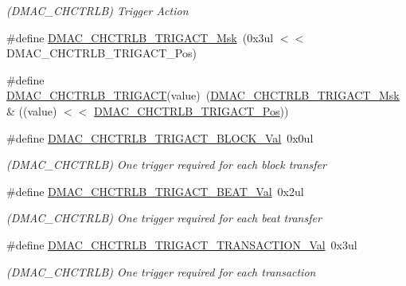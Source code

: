 \begin{DoxyCompactItemize}
\begin{DoxyCompactList}\small\item\em (D\+M\+A\+C\+\_\+\+C\+H\+C\+T\+R\+LB) Trigger Action \end{DoxyCompactList}\item 
\#define \mbox{\hyperlink{group___s_a_m_d21___d_m_a_c_ga539afbe9e0308fd3b76b4ae7ff9db0ff}{D\+M\+A\+C\+\_\+\+C\+H\+C\+T\+R\+L\+B\+\_\+\+T\+R\+I\+G\+A\+C\+T\+\_\+\+Msk}}~(0x3ul $<$$<$ D\+M\+A\+C\+\_\+\+C\+H\+C\+T\+R\+L\+B\+\_\+\+T\+R\+I\+G\+A\+C\+T\+\_\+\+Pos)
\item 
\#define \mbox{\hyperlink{group___s_a_m_d21___d_m_a_c_gabd1ec3b5b2a9f0a0c59797a186296acd}{D\+M\+A\+C\+\_\+\+C\+H\+C\+T\+R\+L\+B\+\_\+\+T\+R\+I\+G\+A\+CT}}(value)~(\mbox{\hyperlink{group___s_a_m_d21___d_m_a_c_ga539afbe9e0308fd3b76b4ae7ff9db0ff}{D\+M\+A\+C\+\_\+\+C\+H\+C\+T\+R\+L\+B\+\_\+\+T\+R\+I\+G\+A\+C\+T\+\_\+\+Msk}} \& ((value) $<$$<$ \mbox{\hyperlink{group___s_a_m_d21___d_m_a_c_gaada77814aa3858a4b49aabef88429c31}{D\+M\+A\+C\+\_\+\+C\+H\+C\+T\+R\+L\+B\+\_\+\+T\+R\+I\+G\+A\+C\+T\+\_\+\+Pos}}))
\item 
\#define \mbox{\hyperlink{group___s_a_m_d21___d_m_a_c_gaa54bf830756309b4ec082836357fc93f}{D\+M\+A\+C\+\_\+\+C\+H\+C\+T\+R\+L\+B\+\_\+\+T\+R\+I\+G\+A\+C\+T\+\_\+\+B\+L\+O\+C\+K\+\_\+\+Val}}~0x0ul
\begin{DoxyCompactList}\small\item\em (D\+M\+A\+C\+\_\+\+C\+H\+C\+T\+R\+LB) One trigger required for each block transfer \end{DoxyCompactList}\item 
\#define \mbox{\hyperlink{group___s_a_m_d21___d_m_a_c_ga5ef24f993615ff0560e51bb28f2b630f}{D\+M\+A\+C\+\_\+\+C\+H\+C\+T\+R\+L\+B\+\_\+\+T\+R\+I\+G\+A\+C\+T\+\_\+\+B\+E\+A\+T\+\_\+\+Val}}~0x2ul
\begin{DoxyCompactList}\small\item\em (D\+M\+A\+C\+\_\+\+C\+H\+C\+T\+R\+LB) One trigger required for each beat transfer \end{DoxyCompactList}\item 
\#define \mbox{\hyperlink{group___s_a_m_d21___d_m_a_c_gab0c773cec6c091dc3bb20e4ccf5699c6}{D\+M\+A\+C\+\_\+\+C\+H\+C\+T\+R\+L\+B\+\_\+\+T\+R\+I\+G\+A\+C\+T\+\_\+\+T\+R\+A\+N\+S\+A\+C\+T\+I\+O\+N\+\_\+\+Val}}~0x3ul
\begin{DoxyCompactList}\small\item\em (D\+M\+A\+C\+\_\+\+C\+H\+C\+T\+R\+LB) One trigger required for each transaction \end{DoxyCompactList}\item 

\end{DoxyCompactItemize}
